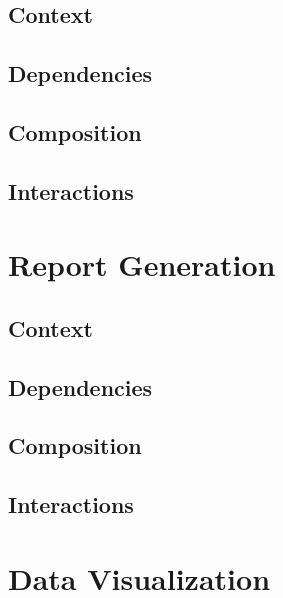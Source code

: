 \documentclass[onecolumn, draftclsnofoot,10pt, compsoc]{IEEEtran}
\begin{document}
\subsection{Context}
\subsection{Dependencies}
\subsection{Composition}
\subsection{Interactions}

\section{Report Generation}
\subsection{Context}
\subsection{Dependencies}
\subsection{Composition}
\subsection{Interactions}

\section{Data Visualization}
\end{document}
